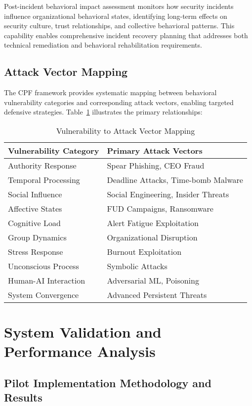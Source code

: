 \documentclass[journal]{IEEEtran}
\begin{document}
Post-incident behavioral impact assessment monitors how security incidents influence organizational behavioral states, identifying long-term effects on security culture, trust relationships, and collective behavioral patterns. This capability enables comprehensive incident recovery planning that addresses both technical remediation and behavioral rehabilitation requirements.

\subsection{Attack Vector Mapping}

The CPF framework provides systematic mapping between behavioral vulnerability categories and corresponding attack vectors, enabling targeted defensive strategies. Table~\ref{tab:mapping} illustrates the primary relationships:

\begin{table}[!t]
\centering
\caption{Vulnerability to Attack Vector Mapping}
\label{tab:mapping}
\begin{tabular}{ll}
\toprule
Vulnerability Category & Primary Attack Vectors \\
\midrule
Authority Response & Spear Phishing, CEO Fraud \\
Temporal Processing & Deadline Attacks, Time-bomb Malware \\
Social Influence & Social Engineering, Insider Threats \\
Affective States & FUD Campaigns, Ransomware \\
Cognitive Load & Alert Fatigue Exploitation \\
Group Dynamics & Organizational Disruption \\
Stress Response & Burnout Exploitation \\
Unconscious Process & Symbolic Attacks \\
Human-AI Interaction & Adversarial ML, Poisoning \\
System Convergence & Advanced Persistent Threats \\
\bottomrule
\end{tabular}
\end{table}

\section{System Validation and Performance Analysis}

\subsection{Pilot Implementation Methodology and Results}
\end{document}
